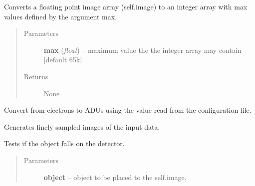 \documentclass[a4paper,11pt,english]{sphinxmanual}
\begin{document}
\begin{fulllineitems}

\begin{fulllineitems}
\label{simulator:simulator.simulator.VISsimulator.discretise}
Converts a floating point image array (self.image) to an integer array with max values
defined by the argument max.
\begin{quote}\begin{description}
\item[{Parameters}] \leavevmode
\textbf{max} (\emph{float}) -- maximum value the the integer array may contain {[}default 65k{]}

\item[{Returns}] \leavevmode
None

\end{description}\end{quote}

\end{fulllineitems}


\begin{fulllineitems}
\label{simulator:simulator.simulator.VISsimulator.electrons2ADU}
Convert from electrons to ADUs using the value read from the configuration file.

\end{fulllineitems}


\begin{fulllineitems}
\label{simulator:simulator.simulator.VISsimulator.generateFinemaps}
Generates finely sampled images of the input data.

\end{fulllineitems}


\begin{fulllineitems}
\label{simulator:simulator.simulator.VISsimulator.objectOnDetector}
Tests if the object falls on the detector.
\begin{quote}\begin{description}
\item[{Parameters}] \leavevmode
\textbf{object} -- object to be placed to the self.image.


\end{description}
\end{quote}
\end{fulllineitems}
\end{fulllineitems}
\end{document}
